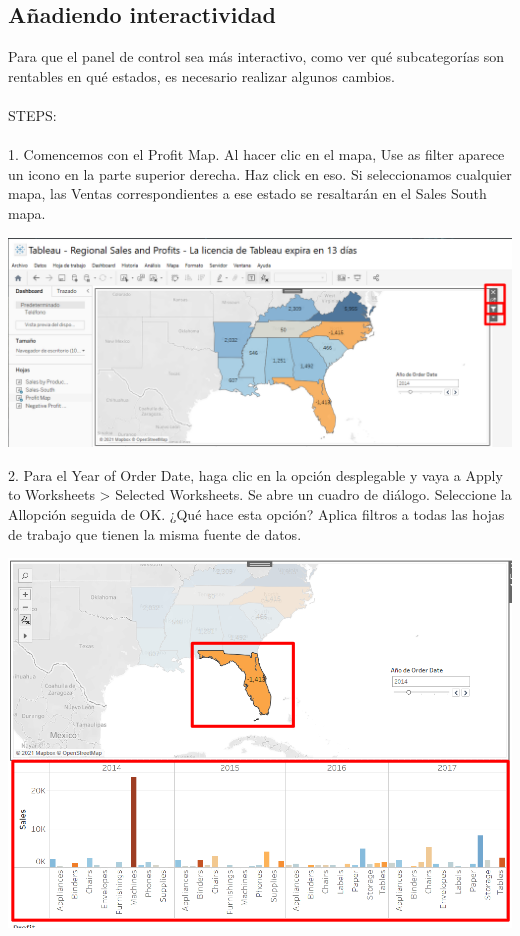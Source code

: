 \documentclass[12pt,letterpaper]{article}
\begin{document}
\subsection{Añadiendo interactividad}
Para que el panel de control sea más interactivo, como ver qué subcategorías son
rentables en qué estados, es necesario realizar algunos cambios.
\\\\STEPS:
\\\\1. Comencemos con el Profit Map. Al hacer clic en el mapa, Use as
filter aparece un icono en la parte superior derecha. Haz click en eso. Si seleccionamos
cualquier mapa, las Ventas correspondientes a ese estado se resaltarán en el Sales South mapa.
\begin{center}
    \includegraphics[width=16cm]{img/53.png}  
\end{center}
2. Para el Year of Order Date, haga clic en la opción desplegable y vaya a Apply to
Worksheets > Selected Worksheets. Se abre un cuadro de diálogo. Seleccione
la Allopción seguida de OK. ¿Qué hace esta opción? Aplica filtros a todas las hojas de trabajo
que tienen la misma fuente de datos.
\begin{center}
    \includegraphics[width=16cm]{img/54.png}  
\end{center}
\end{document}
